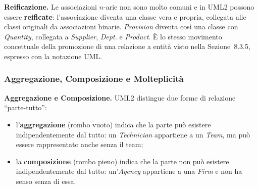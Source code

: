 \documentclass[12pt]{extarticle}
\begin{document}
\medskip
\noindent \textbf{Reificazione.} Le associazioni $n$-arie non sono molto comuni e in UML2 possono essere \textbf{reificate}: l'associazione diventa una classe vera e propria, collegata alle classi originali da associazioni binarie. \textit{Provision} diventa così una classe con \textit{Quantity}, collegata a \textit{Supplier}, \textit{Dept.} e \textit{Product}. È lo stesso movimento concettuale della promozione di una relazione a entità visto nella Sezione~8.3.5, espresso con la notazione UML.

\subsubsection{Aggregazione, Composizione e Molteplicità}

\noindent \textbf{Aggregazione e Composizione.} UML2 distingue due forme di relazione ``parte-tutto'':
\begin{itemize}
    \item l'\textbf{aggregazione} (rombo vuoto) indica che la parte può esistere indipendentemente dal tutto: un \textit{Technician} appartiene a un \textit{Team}, ma può essere rappresentato anche senza il team;
    \item la \textbf{composizione} (rombo pieno) indica che la parte non può esistere indipendentemente dal tutto: un'\textit{Agency} appartiene a una \textit{Firm} e non ha senso senza di essa.
\end{itemize}

\begin{center}
\end{center}

\end{document}
